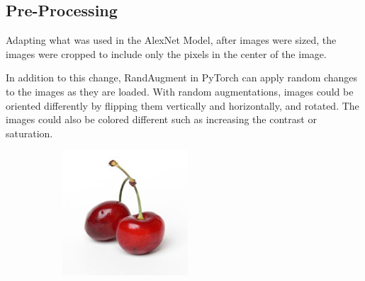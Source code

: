 \documentclass[../main.tex]{subfiles}
\begin{document}
\subsection{Pre-Processing}

Adapting what was used in the AlexNet Model, after images were sized, the images were cropped to include only the pixels in the center of the image.

In addition to this change, RandAugment in PyTorch can apply random changes to the images as they are loaded. With random augmentations, images could be oriented differently by flipping them vertically and horizontally, and rotated. The images could also be colored different such as increasing the contrast or saturation. 

\begin{figure}[h!]
  \centering
  \begin{subfigure}[b]{0.2\linewidth}
    \includegraphics[width=\linewidth]{01-Contrast-Sharpness/original.png}
  \end{subfigure}
  \begin{subfigure}[b]{0.2\linewidth}

\end{subfigure}
\end{figure}
\end{document}
